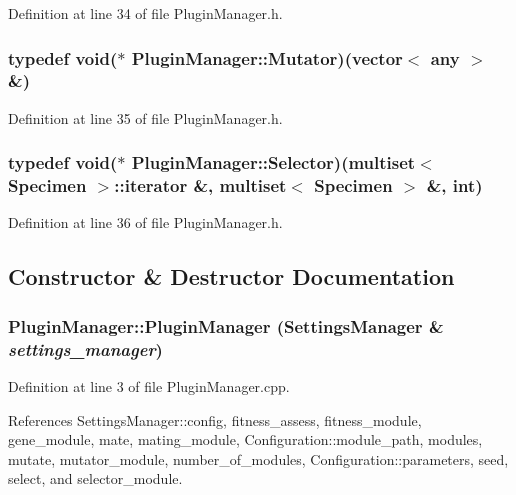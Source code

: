 Definition at line 34 of file PluginManager.h.\hypertarget{classPluginManager_00afabd8a9bbe0fd0c5b90294dc96a45}{
\subsubsection{\setlength{\rightskip}{0pt plus 5cm}typedef void($\ast$ {\bf PluginManager::Mutator})(vector$<$ any $>$ \&)}}
\label{classPluginManager_00afabd8a9bbe0fd0c5b90294dc96a45}




Definition at line 35 of file PluginManager.h.\hypertarget{classPluginManager_64f7347436213b5c961891c7035947cc}{
\subsubsection{\setlength{\rightskip}{0pt plus 5cm}typedef void($\ast$ {\bf PluginManager::Selector})(multiset$<$ {\bf Specimen} $>$::iterator \&, multiset$<$ {\bf Specimen} $>$ \&, int)}}
\label{classPluginManager_64f7347436213b5c961891c7035947cc}




Definition at line 36 of file PluginManager.h.

\subsection{Constructor \& Destructor Documentation}
\hypertarget{classPluginManager_59e57fdbde1831ee0f568f20be6775b1}{
\subsubsection{\setlength{\rightskip}{0pt plus 5cm}PluginManager::PluginManager ({\bf SettingsManager} \& {\em settings\_\-manager})}}
\label{classPluginManager_59e57fdbde1831ee0f568f20be6775b1}




Definition at line 3 of file PluginManager.cpp.

References SettingsManager::config, fitness\_\-assess, fitness\_\-module, gene\_\-module, mate, mating\_\-module, Configuration::module\_\-path, modules, mutate, mutator\_\-module, number\_\-of\_\-modules, Configuration::parameters, seed, select, and selector\_\-module.

